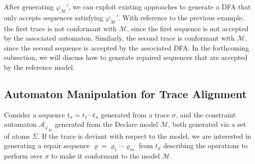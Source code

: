After generating $\varphi_{\mathcal{M}}'$, we can exploit existing approaches \cite{Westergaard11} to generate a DFA that only accepts sequences satisfying $\varphi_{\mathcal{M}}'$. With reference to the previous example, the first trace is not conformant with $\mathcal{M}$, since the first sequence is not accepted by the associated automaton. Similarly, the second trace is conformant with $\mathcal{M}$, since the second sequence is accepted by the associated DFA. In the forthcoming subsection, we will discuss how to generate repaired sequences that are accepted by the reference model.

\subsection{Automaton Manipulation for Trace Alignment}\label{ssec:amfta}
Consider a sequence $t_\sigma=t_1\cdots t_n$ generated from a trace $\sigma$, and the constraint automaton $\mathcal{A}_{\varphi_{\mathcal{M}}}$ generated from the Declare model $\mathcal{M}$, both generated via a set of atoms $\Sigma$. If the trace is deviant with respect to the model, we are interested in generating a repair sequence $\varrho=\varrho_1\cdots \varrho_m$ from $t_\sigma$ describing the operations to perform over $\sigma$ to make it conformant to the model $\mathcal{M}$.

